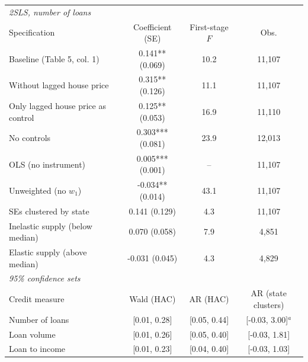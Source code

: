 \begin{tabular}{lccc}
\toprule
\multicolumn{4}{l}{\textit{2SLS, number of loans}} \\
Specification & Coefficient (SE) & First-stage $F$ & Obs. \\
\midrule
Baseline (Table 5, col. 1) & 0.141** (0.069) & 10.2 & 11,107 \\
Without lagged house price & 0.315** (0.126) & 11.1 & 11,107 \\
Only lagged house price as control & 0.125** (0.053) & 16.9 & 11,110 \\
No controls & 0.303*** (0.081) & 23.9 & 12,013 \\
OLS (no instrument) & 0.005*** (0.001) & -- & 11,107 \\
Unweighted (no $w_1$) & -0.034** (0.014) & 43.1 & 11,107 \\
SEs clustered by state & 0.141 (0.129) & 4.3 & 11,107 \\
Inelastic supply (below median) & 0.070 (0.058) & 7.9 & 4,851 \\
Elastic supply (above median) & -0.031 (0.045) & 4.3 & 4,829 \\
\midrule
\multicolumn{4}{l}{\textit{95\% confidence sets}} \\
Credit measure & Wald (HAC) & AR (HAC) & AR (state clusters) \\
\midrule
Number of loans & [0.01, 0.28] & [0.05, 0.44] & [-0.03, 3.00]$^{a}$ \\
Loan volume & [0.01, 0.26] & [0.05, 0.40] & [-0.03, 1.81] \\
Loan to income & [0.01, 0.23] & [0.04, 0.40] & [-0.03, 1.03] \\
\bottomrule
\end{tabular}